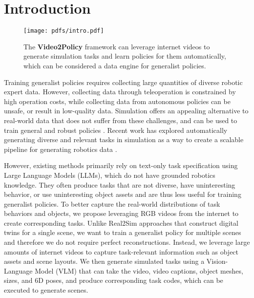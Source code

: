 \section{Introduction}

\begin{figure*}
    \centering
    \vskip -0.2cm
    \texttt{[image: pdfs/intro.pdf]}
    \vskip -0.2cm
    \caption{The \textbf{Video2Policy} framework can leverage internet videos to generate simulation tasks and learn policies for them automatically, which can be considered a data engine for generalist policies.}
    \label{fig:intro}
    \vskip -0.4cm
\end{figure*}

Training generalist policies requires collecting large quantities of diverse robotic expert data. However, collecting data through teleoperation is constrained by high operation costs, while collecting data from autonomous policies can be unsafe, or result in low-quality data. Simulation offers an appealing alternative to real-world data that does not suffer from these challenges, and can be used to train general and robust policies \citep{hwangbo2019learning,andrychowicz2020learning}. Recent work has explored automatically generating diverse and relevant tasks in simulation as a way to create a scalable pipeline for generating robotics data \citep{deitke2022, wang2023gensim, wang2023robogen, makatura2023can}. 

However, existing methods primarily rely on text-only task specification using Large Language Models (LLMs), which do not have grounded robotics knowledge. They often produce tasks that are not diverse, have uninteresting behavior, or use uninteresting object assets and are thus less useful for training generalist policies. To better capture the real-world distributions of task behaviors and objects, we propose leveraging RGB videos from the internet to create corresponding tasks. Unlike Real2Sim approaches that construct digital twins \citep{hsu2023ditto, torne2024reconciling} for a single scene, we want to train a generalist policy for multiple scenes and therefore we do not require perfect reconstructions. Instead, we leverage large amounts of internet videos to capture task-relevant information such as object assets and scene layouts. 
We then generate simulated tasks using a Vision-Language Model (VLM) that can take the video, video captions, object meshes, sizes, and 6D poses, and produce corresponding task codes, which can be executed to generate scenes.

